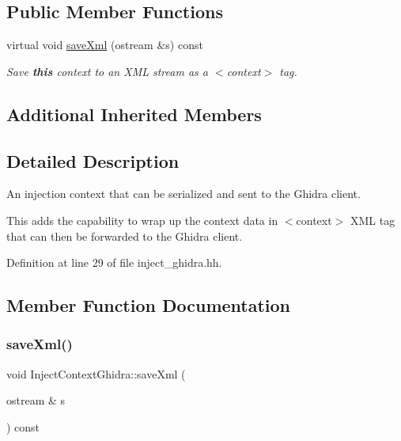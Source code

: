 \subsection*{Public Member Functions}
\begin{DoxyCompactItemize}
\item 
virtual void \mbox{\hyperlink{class_inject_context_ghidra_a32151798bd5739d2afecf9f0824de4e8}{save\+Xml}} (ostream \&s) const
\begin{DoxyCompactList}\small\item\em Save {\bfseries{this}} context to an X\+ML stream as a $<$context$>$ tag. \end{DoxyCompactList}\end{DoxyCompactItemize}
\subsection*{Additional Inherited Members}


\subsection{Detailed Description}
An injection context that can be serialized and sent to the Ghidra client. 

This adds the capability to wrap up the context data in $<$context$>$ X\+ML tag that can then be forwarded to the Ghidra client. 

Definition at line 29 of file inject\+\_\+ghidra.\+hh.



\subsection{Member Function Documentation}
\mbox{\label{class_inject_context_ghidra_a32151798bd5739d2afecf9f0824de4e8}} 
\subsubsection{\texorpdfstring{saveXml()}{saveXml()}}
{\footnotesize\ttfamily void Inject\+Context\+Ghidra\+::save\+Xml (\begin{DoxyParamCaption}\item[{ostream \&}]{s }\end{DoxyParamCaption}) const\hspace{0.3cm}{\ttfamily [virtual]}}



